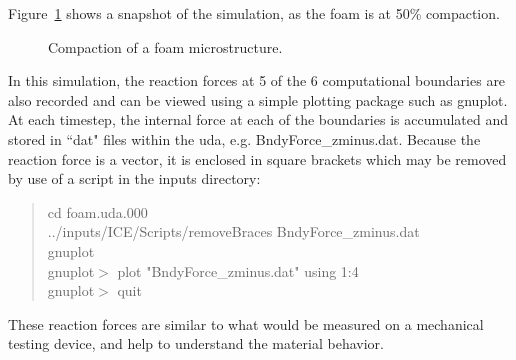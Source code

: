 \documentclass[fleqn]{article}
\begin{document}
Figure~\ref{figfoam} shows a snapshot of the simulation, as the foam
is at 50\% compaction.

\begin{figure}[b]
  \center
  \caption{Compaction of a foam microstructure.}
  \label{figfoam}
\end{figure}

In this simulation, the reaction forces at 5 of the 6 computational boundaries
are also recorded and can be viewed using a simple plotting package such
as gnuplot.  At each timestep, the internal force at each of the boundaries
is accumulated and stored in ``dat" files within the uda,
e.g. BndyForce\_zminus.dat.  Because the reaction force is a vector, it
is enclosed in square brackets which may be removed by use of a script in
the inputs directory:

\begin{quote}
cd foam.uda.000 \\
../inputs/ICE/Scripts/removeBraces BndyForce\_zminus.dat \\
gnuplot \\
gnuplot$>$ plot "BndyForce\_zminus.dat" using 1:4 \\
gnuplot$>$ quit 
\end{quote}

These reaction forces are similar to what would be measured on a mechanical
testing device, and help to understand the material behavior.


\end{document}
